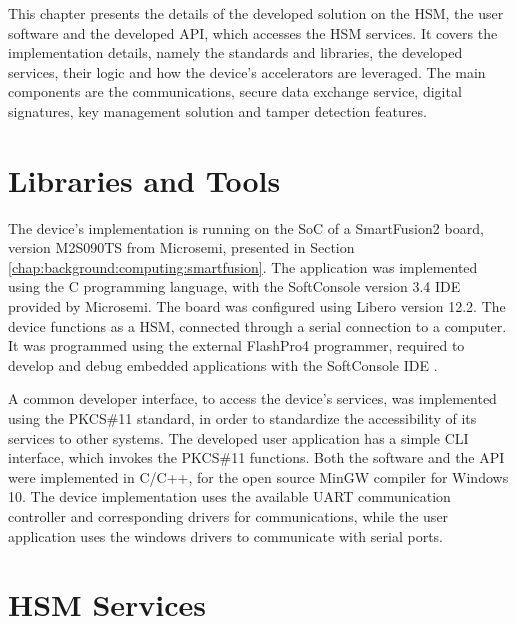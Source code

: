 \cleardoublepage
\label{chap:implementation}

This chapter presents the details of the developed solution on the HSM, the user software and the developed API, which accesses the HSM services.
It covers the implementation details, namely the standards and libraries, the developed services, their logic and how the device's accelerators are leveraged. The main components are the communications, secure data exchange service, digital signatures, key management solution and tamper detection features.

\section{Libraries and Tools}\label{chap:implementation:tools}

The device's implementation is running on the SoC of a SmartFusion2 board, version M2S090TS from Microsemi, presented in Section \ref{chap:background:computing:smartfusion}.
The application was implemented using the C programming language, with the SoftConsole version 3.4 \ac{IDE} provided by Microsemi. The board was configured using Libero version 12.2.
The device functions as a HSM, connected through a serial connection to a computer. It was programmed using the external FlashPro4 programmer, required to develop and debug embedded applications with the SoftConsole IDE \cite{smartfusionSecurityPractices}.

A common developer interface, to access the device's services, was implemented using the PKCS\#11 standard, in order to standardize the accessibility of its services to other systems. The developed user application has a simple \ac{CLI} interface, which invokes the PKCS\#11 functions.
Both the software and the API were implemented in C/C++, for the open source MinGW compiler for Windows 10.
The device implementation uses the available \ac{UART} communication controller and corresponding drivers for communications, while the user application uses the windows drivers to communicate with serial ports.

\section{HSM Services}\label{chap:implementation:services}

